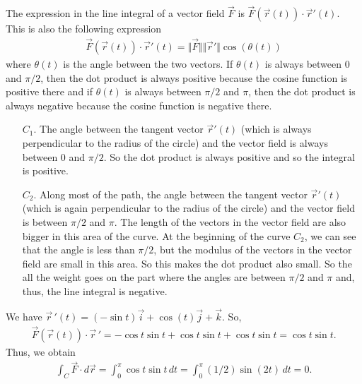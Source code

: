 	\spc

	The expression in the line integral of a vector field $\vec{F}$ is $\vec{F} (\vec{r}(t)) \cdot \vec{r}'(t)$. This is also the following expression
		\begin{align*}
		\vec{F} (\vec{r}(t)) \cdot \vec{r}'(t) = \Vert \vec{F} \Vert \Vert \vec{r}' \Vert \cos (\theta (t) )
		\end{align*}
	where $\theta (t)$ is the angle between the two vectors. If $\theta (t)$ is always between $0$ and $\pi/2$, then the dot product is always positive because the cosine function is positive there and if $\theta (t)$ is always between $\pi/2$ and $\pi$, then the dot product is always negative because the cosine function is negative there.
	
	\begin{enumerate}
	\item[$C_1$.] The angle between the tangent vector $\vec{r}'(t)$ (which is always perpendicular to the radius of the circle) and the vector field is always between $0$ and $\pi/2$. So the dot product is always positive and so the integral is positive.
	\item[$C_2$.] Along most of the path, the angle between the tangent vector $\vec{r}'(t)$ (which is again perpendicular to the radius of the circle) and the vector field is between $\pi/2$ and $\pi$. The length of the vectors in the vector field are also bigger in this area of the curve. At the beginning of the curve $C_2$, we can see that the angle is less than $\pi/2$, but the modulus of the vectors in the vector field are small in this area. So this makes the dot product also small. So the all the weight goes on the part where the angles are between $\pi/2$ and $\pi$ and, thus, the line integral is negative.
	\end{enumerate}

	\spc
	
	We have $\vec{r}\,'(t) = (-\sin t) \vec{i} + \cos (t) \vec{j} + \vec{k}$. So,
		\begin{align*}
		\vec{F} (\vec{r}(t)) \cdot \vec{r}\,' = -\cos t \sin t  + \cos t \sin t + \cos t \sin t = \cos t \sin t .
		\end{align*}
	Thus, we obtain
		\begin{align*}
		\int_C \vec{F} \cdot d \vec{r} = \int_0^\pi \cos t \sin t \, dt = \int_0^\pi (1/2) \sin (2t) \, dt = 0.
		\end{align*}
		
	\spc
	

